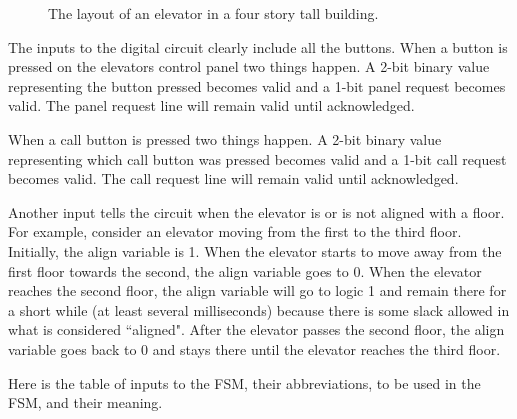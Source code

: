 \begin{enumerate}
\begin{figure}[ht]
\caption{The layout of an elevator in a four story tall building.}
\label{fig:elevator}
\end{figure}

The inputs to the digital circuit clearly include all the buttons.
When a button is pressed on the elevators control panel two things
happen.  A 2-bit binary value representing the button pressed
becomes valid and a 1-bit panel request becomes valid.  The
panel request line will remain valid until acknowledged.

When a call button is pressed two things happen.  A 2-bit binary value
representing which call button was pressed becomes valid and a 1-bit
call request becomes valid.  The call request line will remain valid
until acknowledged.

Another input tells the circuit when the
elevator is or is not aligned with a floor.  For example, consider
an elevator moving from the first to the third floor.  Initially, the
align variable is 1.  When the elevator starts
to move away from the first floor towards the second, the align
variable goes to 0.  When the elevator reaches the second floor, the
align variable will go to logic 1 and remain there for a short
while (at least several milliseconds) because there is some
slack allowed in what is considered ``aligned".  After the elevator
passes the second floor, the align variable goes back to 0 and stays
there until the elevator reaches the third floor.

Here is the table of inputs to the FSM, their abbreviations, to be
used in the FSM, and their meaning.


\end{enumerate}
